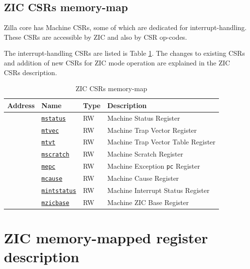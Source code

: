 \subsection{ZIC CSRs memory-map}
\label{subsec:zic-csrs-mem-map}
Zilla core has Machine CSRs, some of which are dedicated for interrupt-handling. These CSRs are accessible by ZIC and also by CSR op-codes.

The interrupt-handling CSRs are listed is Table \ref{tab:zic-csr-memory-map}. The changes to existing CSRs and addition of new CSRs for ZIC mode operation are explained in the ZIC CSRs description.

\vspace{1.25cm}
\begin{table}[H]
    \centering
    \caption{ZIC CSRs memory-map}
    \label{tab:zic-csr-memory-map}
    \vspace{0.75cm}
    \begin{tabular}{l l l l}
    \hline 
        \textbf{Address} & \textbf{Name} & \textbf{Type} & \textbf{Description} \\ \hline \hline
        \texttt{} & \texttt{\hyperref[subsec:mstatus]{mstatus}} & RW & Machine Status Register \\ \hline 
        \texttt{} & \texttt{\hyperref[subsec:mtvec]{mtvec}} & RW & Machine Trap Vector Register \\ \hline
        \texttt{} & \texttt{\hyperref[subsec:mtvt]{mtvt}} & RW & Machine Trap Vector Table Register \\ \hline
        \texttt{} & \texttt{\hyperref[subsec:mscratch]{mscratch}} & RW & Machine Scratch Register \\ \hline
        \texttt{} & \texttt{\hyperref[subsec:mepc]{mepc}} & RW & Machine Exception \texttt{pc} Register \\ \hline
        \texttt{} & \texttt{\hyperref[subsec:mcause]{mcause}} & RW & Machine Cause Register \\ \hline
        \texttt{} & \texttt{\hyperref[subsec:mintstatus]{mintstatus}} & RW & Machine Interrupt Status Register \\ \hline
        \texttt{} & \texttt{\hyperref[subsec:mzicbase]{mzicbase}} & RW & Machine ZIC Base Register \\ \hline
        \end{tabular}
\end{table}

\section{ZIC memory-mapped register description}
\label{sec:zic-mem-map-register-description}

